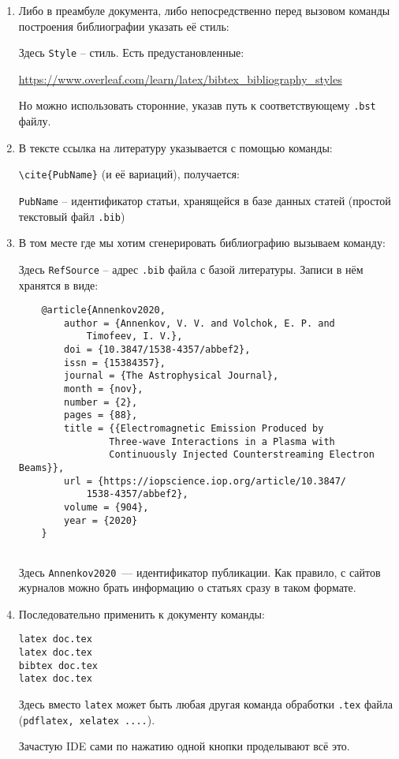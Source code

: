 \begin{enumerate}
	\item Либо в преамбуле документа, либо непосредственно перед вызовом команды построения библиографии указать её стиль:  
	
	\verb||
	
	Здесь \verb|Style| -- стиль. Есть предустановленные:
	
	\href{https://www.overleaf.com/learn/latex/bibtex_bibliography_styles}{https://www.overleaf.com/learn/latex/bibtex\_bibliography\_styles}
	
	Но можно использовать сторонние, указав путь к соответствующему \verb|.bst| файлу.
	\item В тексте ссылка на литературу указывается с помощью команды: 
	
	\verb|\cite{PubName}| (и её вариаций), получается: \cite{Annenkov2018,Annenkov2019,Annenkov2020,AnnenkovThesis2019}
	
	\verb|PubName| -- идентификатор статьи, хранящейся в базе данных статей (простой текстовый файл \verb|.bib|)
	
	\item В том месте где мы хотим сгенерировать библиографию вызываем команду:
	
	\verb||
	
	Здесь \verb|RefSource| -- адрес  \verb|.bib| файла с базой литературы. Записи в нём хранятся в виде:
	
\begin{small}
\begin{verbatim}
	@article{Annenkov2020,
		author = {Annenkov, V. V. and Volchok, E. P. and 
			Timofeev, I. V.},
		doi = {10.3847/1538-4357/abbef2},
		issn = {15384357},
		journal = {The Astrophysical Journal},
		month = {nov},
		number = {2},
		pages = {88},
		title = {{Electromagnetic Emission Produced by 
				Three-wave Interactions in a Plasma with 
				Continuously Injected Counterstreaming Electron Beams}},
		url = {https://iopscience.iop.org/article/10.3847/
			1538-4357/abbef2},
		volume = {904},
		year = {2020}
	}
	
\end{verbatim}

\end{small}

Здесь \verb|Annenkov2020|~--- идентификатор публикации. Как правило, с сайтов журналов можно брать информацию о статьях сразу в таком формате.

\item  Последовательно применить к документу команды:

\begin{verbatim}
latex doc.tex
latex doc.tex
bibtex doc.tex
latex doc.tex
\end{verbatim}

Здесь вместо \verb|latex| может быть любая другая команда обработки \verb|.tex| файла (\verb|pdflatex, xelatex ....|). 

Зачастую IDE сами по нажатию одной кнопки проделывают всё это.
\end{enumerate}

